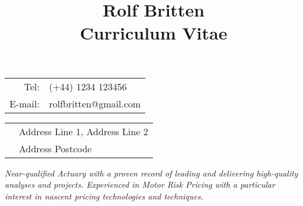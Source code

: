 \documentclass[11pt]{article}
\title{\bfseries \Huge Rolf Britten \\ \Large Curriculum Vitae}
\date{}
\begin{document}
\vspace{-20mm}
\maketitle
\vspace{-20mm}
\begin{minipage}[ht]{0.48\textwidth}
\begin{tabular}{r l}
Tel: & (+44) 1234 123456\\
E-mail: & rolfbritten@gmail.com\\
\end{tabular}
\end{minipage}
\begin{minipage}[ht]{0.48\textwidth}
\begin{tabular}{l l}
& Address Line 1, Address Line 2\\
& Address Postcode\
\end{tabular}
\end{minipage}

\begin{center} \emph{ Near-qualified Actuary with a proven record of leading and delivering high-quality analyses and projects. Experienced in Motor Risk Pricing with a particular interest in nascent pricing technologies and techniques.} \end{center}
\end{document}
